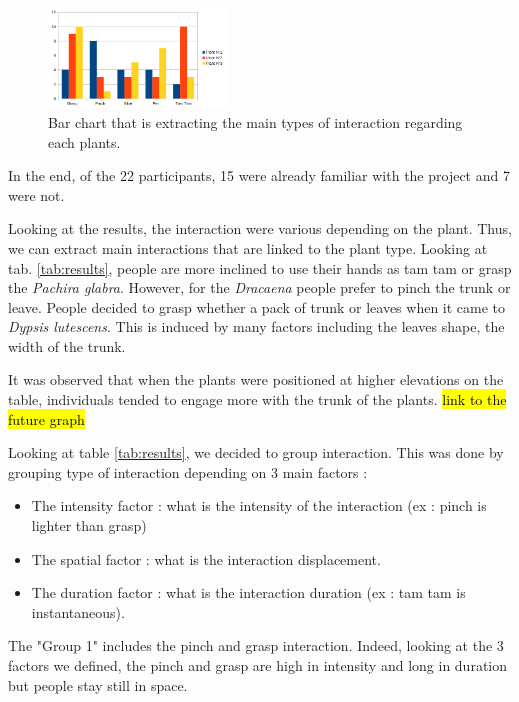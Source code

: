 \begin{figure}[ht]
    \centering
    \includegraphics[width=0.42\textwidth]{Images/plant_interaction_chart.png}
    \caption{Bar chart that is extracting the main types of interaction regarding each plants.}
    
    \vspace{-0.5cm}
    \label{fig:setup_user_study}
    \vspace{0.2cm}
\end{figure}

In the end, of the 22 participants, 15 were already familiar with the project and 7 were not.


Looking at the results, the interaction were various depending on the plant. Thus, we can extract main interactions that are linked to the plant type. Looking at tab. \ref{tab:results}, people are more inclined to use their hands as tam tam or grasp the \textit{Pachira glabra}. However, for the \textit{Dracaena} people prefer to pinch the trunk or leave. People decided to grasp whether a pack of trunk or leaves when it came to \textit{Dypsis lutescens}.
This is induced by many factors including the leaves shape, the width of the trunk.


It was observed that when the plants were positioned at higher elevations on the table, individuals tended to engage more with the trunk of the plants. \hl{link to the future graph}

Looking at table \ref{tab:results}, we decided to group interaction. This was done by grouping type of interaction depending on 3 main factors :

\begin{itemize}
    \item The intensity factor : what is the intensity of the interaction (ex : pinch is lighter than grasp)
    \item The spatial factor : what is the interaction displacement.
    \item The duration factor : what is the interaction duration (ex : tam tam is instantaneous).
\end{itemize}

The "Group 1" includes the pinch and grasp interaction. Indeed, looking at the 3 factors we defined, the pinch and grasp are high in intensity and long in duration but people stay still in space.

